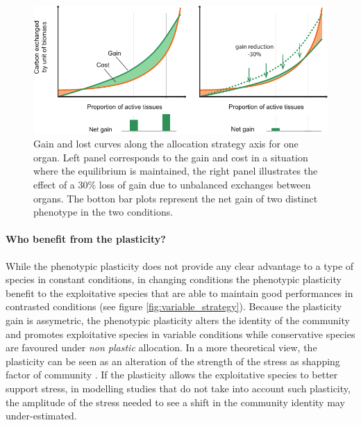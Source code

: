 

\begin{figure}
\includegraphics[width = \textwidth]{./2_PP/Figures/Variable/explain_assymetry.pdf}
\caption[Assymetric gain from gains and costs perspective]{Gain and lost curves along the allocation strategy axis for one organ. Left panel corresponds to the gain and cost in a situation where the equilibrium is maintained, the right panel illustrates the effect of a 30\% loss of gain due to unbalanced exchanges between organs. The botton bar plots represent the net gain of two distinct phenotype in the two conditions.}\label{fig:assymetric_gain}
\end{figure}

\paragraph{Who benefit from the plasticity?}
While the phenotypic plasticity does not provide any clear advantage to a type of species in constant conditions, in changing conditions the phenotypic plasticity benefit to the exploitative species that are able to maintain good performances in contrasted conditions (see figure \ref{fig:variable_strategy}). Because the plasticity gain is assymetric, the phenotypic plasticity alters the identity of the community and promotes exploitative species in variable conditions while conservative species are favoured under \textit{non plastic} allocation. In a more theoretical view, the plasticity can be seen as an alteration of the strength of the stress as shapping factor of community \parencite{grime_evidence_1977}. If the plasticity allows the exploitative species to better support stress, in modelling studies that do not take into account such plasticity, the amplitude of the stress needed to see a shift in the community identity may under-estimated.

